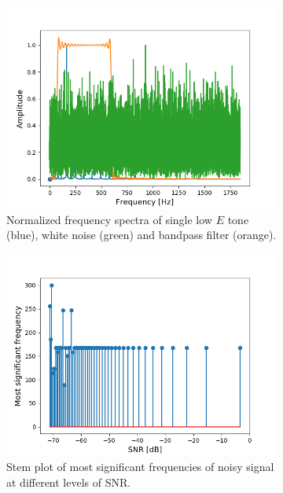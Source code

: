 \begin{figure}[H]
\begin{subfigure}{0.49\textwidth}
\centering
\includegraphics[width=\textwidth]{figures/SNR/white_spectrum.png}
\caption{Normalized frequency spectra of single low $E$ tone (blue), white noise (green) and bandpass filter (orange).}
\label{fig:white_spectrum}
\end{subfigure}
\begin{subfigure}{0.49\textwidth}
\centering
\includegraphics[width=\textwidth]{figures/SNR/white_stem.png}
\caption{Stem plot of most significant frequencies of noisy signal at different levels of SNR.}
\label{fig:white_stem}
\end{subfigure}
\caption{}
\label{fig:white_noise}
\end{figure}

